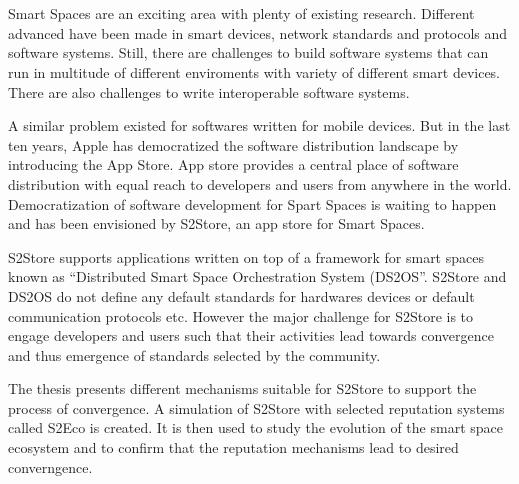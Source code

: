 \chapter{\abstractname}

Smart Spaces are an exciting area with plenty of existing research. Different advanced have been made in smart devices, network standards and protocols and software systems. Still, there are challenges to build software systems that can run in multitude of different enviroments with variety of different smart devices. There are also challenges to write interoperable software systems.

A similar problem existed for softwares written for mobile devices. But in the last ten years, Apple has democratized the software distribution landscape by introducing the App Store. App store provides a central place of software distribution with equal reach to developers and users from anywhere in the world. Democratization of software development for Spart Spaces is waiting to happen and has been envisioned by S2Store, an app store for Smart Spaces. 

S2Store supports applications written on top of a framework for smart spaces known as ``Distributed Smart Space Orchestration System (DS2OS''. S2Store and DS2OS do not define any default standards for hardwares devices or default communication protocols etc. However the major challenge for S2Store is to engage developers and users such that their activities lead towards convergence and thus emergence of standards selected by the community.

The thesis presents different mechanisms suitable for S2Store to support the process of convergence. A simulation of S2Store with selected reputation systems called S2Eco is created. It is then used to study the evolution of the smart space ecosystem and to confirm that the reputation mechanisms lead to desired converngence.
